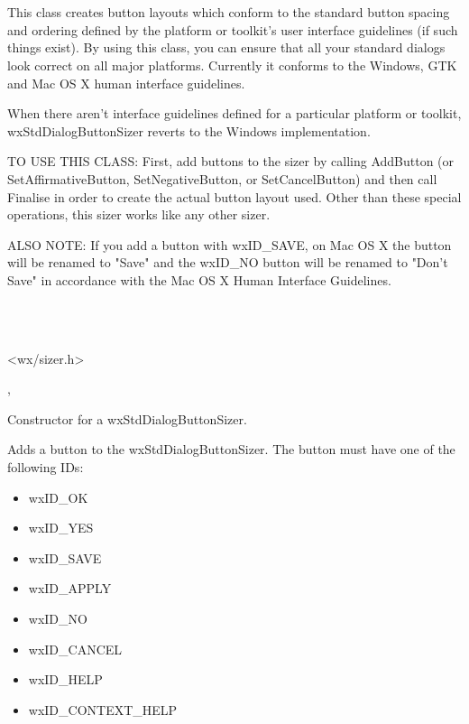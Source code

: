 \section{}\label{wxstddialogbuttonsizer}

This class creates button layouts which conform to the standard button spacing and ordering defined by the platform or toolkit's user interface guidelines (if such things exist). By using this class, you can ensure that all your standard dialogs look correct on all major platforms. Currently it conforms to the Windows, GTK and Mac OS X human interface guidelines.

When there aren't interface guidelines defined for a particular platform or toolkit, wxStdDialogButtonSizer reverts to the Windows implementation. 

TO USE THIS CLASS: First, add buttons to the sizer by calling AddButton (or SetAffirmativeButton, SetNegativeButton, or SetCancelButton) and then call Finalise in order to create the actual button layout used. Other than these special operations, this sizer works like any other sizer. 

ALSO NOTE: If you add a button with wxID\_SAVE, on Mac OS X the button will be renamed to "Save" and the wxID\_NO button will be renamed to "Don't Save" in accordance with the Mac OS X Human Interface Guidelines.


\\
\\


<wx/sizer.h>


, 


Constructor for a wxStdDialogButtonSizer.

\label{wxstddialogbuttonsizeraddbutton}


Adds a button to the wxStdDialogButtonSizer. The button must have one of the following IDs:

\begin{itemize}
	\item wxID\_OK
	\item wxID\_YES
	\item wxID\_SAVE
	\item wxID\_APPLY
	\item wxID\_NO
	\item wxID\_CANCEL
	\item wxID\_HELP
	\item wxID\_CONTEXT\_HELP
\end{itemize}

